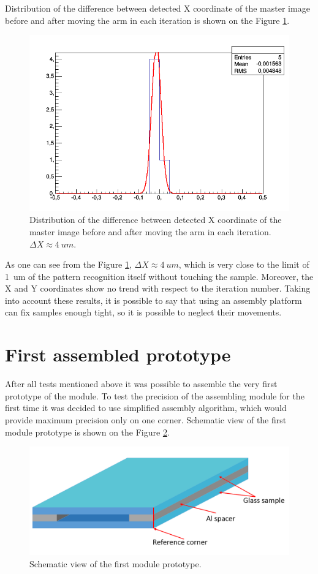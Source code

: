 Distribution of the difference between detected X coordinate of the master image before and after moving the arm in each iteration is shown on the Figure \ref{fig:platform_distribution}.

\begin{figure}[ht]\centering
\includegraphics[width=0.8\linewidth]{Data/Precision_tests/Platform_x_distrib.png}
\caption{Distribution of the difference between detected X coordinate of the master image before and after moving the arm in each iteration. $\Delta X \approx 4~um$. }
\label{fig:platform_distribution}
\end{figure}

As one can see from the Figure \ref{fig:platform_distribution}, $\Delta X \approx 4~um$, which is very close to the limit of 1~um of the pattern recognition itself without touching the sample. Moreover, the X and Y coordinates show no trend with respect to the iteration number. Taking into account these results, it is possible to say that using an assembly platform can fix samples enough tight, so it is possible to neglect their movements.

\section{First assembled prototype}

After all tests mentioned above it was possible to assemble the very first prototype of the module. To test the precision of the assembling module for the first time it was decided to use simplified assembly algorithm, which would provide maximum precision only on one corner. Schematic view of the first module prototype is shown on the Figure \ref{fig:module_prototype}.

\begin{figure}[ht]\centering
\includegraphics[width=0.8\linewidth]{Data/Precision_tests/Module_prototype.png}
\caption{Schematic view of the first module prototype.}
\label{fig:module_prototype}
\end{figure}

